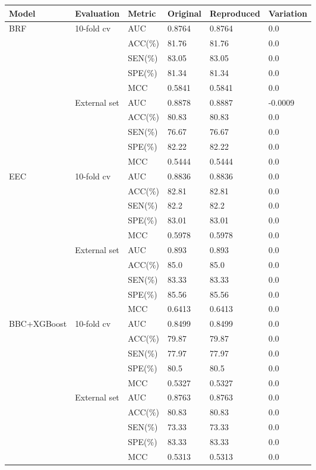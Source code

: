 \begin{tabular}{llllll}
\toprule
Model & Evaluation & Metric & Original & Reproduced & Variation \\
\midrule
BRF & 10-fold cv & AUC & 0.8764 & 0.8764 & 0.0 \\
 &  & ACC(\%) & 81.76 & 81.76 & 0.0 \\
 &  & SEN(\%) & 83.05 & 83.05 & 0.0 \\
 &  & SPE(\%) & 81.34 & 81.34 & 0.0 \\
 &  & MCC & 0.5841 & 0.5841 & 0.0 \\
 & External set & AUC & 0.8878 & 0.8887 & -0.0009 \\
 &  & ACC(\%) & 80.83 & 80.83 & 0.0 \\
 &  & SEN(\%) & 76.67 & 76.67 & 0.0 \\
 &  & SPE(\%) & 82.22 & 82.22 & 0.0 \\
 &  & MCC & 0.5444 & 0.5444 & 0.0 \\
EEC & 10-fold cv & AUC & 0.8836 & 0.8836 & 0.0 \\
 &  & ACC(\%) & 82.81 & 82.81 & 0.0 \\
 &  & SEN(\%) & 82.2 & 82.2 & 0.0 \\
 &  & SPE(\%) & 83.01 & 83.01 & 0.0 \\
 &  & MCC & 0.5978 & 0.5978 & 0.0 \\
 & External set & AUC & 0.893 & 0.893 & 0.0 \\
 &  & ACC(\%) & 85.0 & 85.0 & 0.0 \\
 &  & SEN(\%) & 83.33 & 83.33 & 0.0 \\
 &  & SPE(\%) & 85.56 & 85.56 & 0.0 \\
 &  & MCC & 0.6413 & 0.6413 & 0.0 \\
BBC+XGBoost & 10-fold cv & AUC & 0.8499 & 0.8499 & 0.0 \\
 &  & ACC(\%) & 79.87 & 79.87 & 0.0 \\
 &  & SEN(\%) & 77.97 & 77.97 & 0.0 \\
 &  & SPE(\%) & 80.5 & 80.5 & 0.0 \\
 &  & MCC & 0.5327 & 0.5327 & 0.0 \\
 & External set & AUC & 0.8763 & 0.8763 & 0.0 \\
 &  & ACC(\%) & 80.83 & 80.83 & 0.0 \\
 &  & SEN(\%) & 73.33 & 73.33 & 0.0 \\
 &  & SPE(\%) & 83.33 & 83.33 & 0.0 \\
 &  & MCC & 0.5313 & 0.5313 & 0.0 \\

\end{tabular}
